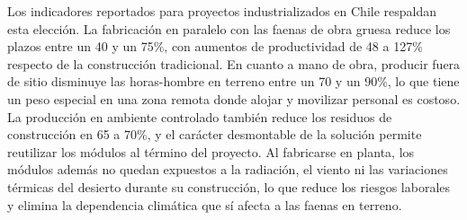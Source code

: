 Los indicadores reportados para proyectos industrializados en Chile \cite{GuiaMMC} respaldan esta elección. La fabricación en paralelo con las faenas de obra gruesa reduce los plazos entre un 40 y un 75\%, con aumentos de productividad de 48 a 127\% respecto de la construcción tradicional. En cuanto a mano de obra, producir fuera de sitio disminuye las horas-hombre en terreno entre un 70 y un 90\%, lo que tiene un peso especial en una zona remota donde alojar y movilizar personal es costoso. La producción en ambiente controlado también reduce los residuos de construcción en 65 a 70\%, y el carácter desmontable de la solución permite reutilizar los módulos al término del proyecto. Al fabricarse en planta, los módulos además no quedan expuestos a la radiación, el viento ni las variaciones térmicas del desierto durante su construcción, lo que reduce los riesgos laborales y elimina la dependencia climática que sí afecta a las faenas en terreno.
